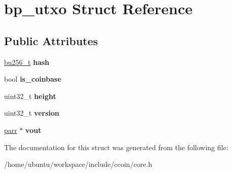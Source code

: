 \hypertarget{structbp__utxo}{\section{bp\-\_\-utxo Struct Reference}
\label{structbp__utxo}
}
\subsection*{Public Attributes}
\begin{DoxyCompactItemize}
\item 
\hypertarget{structbp__utxo_afb499b71ea067bbf1e89109601a2a2a4}{\hyperlink{structbu256}{bu256\-\_\-t} {\bfseries hash}}\label{structbp__utxo_afb499b71ea067bbf1e89109601a2a2a4}

\item 
\hypertarget{structbp__utxo_a0296809ba191ae4b86046172a2b5508b}{bool {\bfseries is\-\_\-coinbase}}\label{structbp__utxo_a0296809ba191ae4b86046172a2b5508b}

\item 
\hypertarget{structbp__utxo_a6b1598d4015ed825f408c0d0accca3e0}{uint32\-\_\-t {\bfseries height}}\label{structbp__utxo_a6b1598d4015ed825f408c0d0accca3e0}

\item 
\hypertarget{structbp__utxo_a56b1c36be61bc1f780ffed84fa94355c}{uint32\-\_\-t {\bfseries version}}\label{structbp__utxo_a56b1c36be61bc1f780ffed84fa94355c}

\item 
\hypertarget{structbp__utxo_a6fb08e3e8203328d62e4a66f91cf9c0e}{\hyperlink{structparr}{parr} $\ast$ {\bfseries vout}}\label{structbp__utxo_a6fb08e3e8203328d62e4a66f91cf9c0e}

\end{DoxyCompactItemize}


The documentation for this struct was generated from the following file\-:\begin{DoxyCompactItemize}
\item 
/home/ubuntu/workspace/include/ccoin/core.\-h\end{DoxyCompactItemize}
